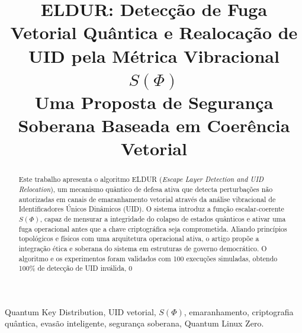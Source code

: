 \documentclass[conference]{IEEEtran}
\title{%
    ELDUR: Detecção de Fuga Vetorial Quântica e Realocação de UID pela Métrica Vibracional $S(\Phi)$ \\
    \Large Uma Proposta de Segurança Soberana Baseada em Coerência Vetorial
}
\author{
    \IEEEauthorblockN{Deywe Okabe}
    \IEEEauthorblockA{\textit{CO2Banky / Harpia Quantum Core} \\
    deywe.okabe@co2banky.org}
}
\begin{document}
\maketitle

\begin{abstract}
Este trabalho apresenta o algoritmo ELDUR (\textit{Escape Layer Detection and UID Relocation}), um mecanismo quântico de defesa ativa que detecta perturbações não autorizadas em canais de emaranhamento vetorial através da análise vibracional de Identificadores Únicos Dinâmicos (UID). O sistema introduz a função escalar-coerente $S(\Phi)$, capaz de mensurar a integridade do colapso de estados quânticos e ativar uma fuga operacional antes que a chave criptográfica seja comprometida. Aliando princípios topológicos e físicos com uma arquitetura operacional ativa, o artigo propõe a integração ética e soberana do sistema em estruturas de governo democrático. O algoritmo e os experimentos foram validados com 100 execuções simuladas, obtendo 100\% de detecção de UID inválida, 0%
\end{abstract}

\vspace{1em}

\begin{IEEEkeywords}
Quantum Key Distribution, UID vetorial, $S(\Phi)$, emaranhamento, criptografia quântica, evasão inteligente, segurança soberana, Quantum Linux Zero.
\end{IEEEkeywords}










\end{document}
